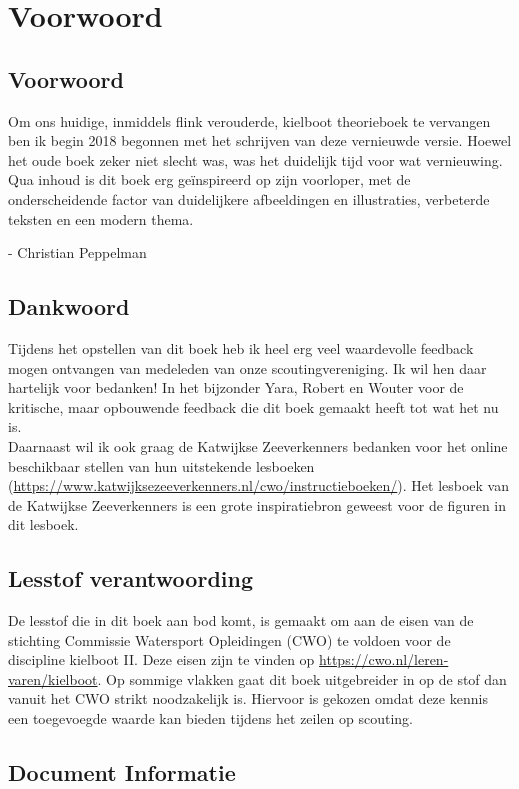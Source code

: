 \chapter*{Voorwoord}

\section{Voorwoord}
Om ons huidige, inmiddels flink verouderde, kielboot theorieboek te vervangen ben ik begin 2018 begonnen met het schrijven van deze vernieuwde versie. Hoewel het oude boek zeker niet slecht was, was het duidelijk tijd voor wat vernieuwing. Qua inhoud is dit boek erg geïnspireerd op zijn voorloper, met de onderscheidende factor van duidelijkere afbeeldingen en illustraties, verbeterde teksten en een modern thema.

- Christian Peppelman
\section{Dankwoord}
Tijdens het opstellen van dit boek heb ik heel erg veel waardevolle feedback mogen ontvangen van medeleden van onze scoutingvereniging. Ik wil hen daar hartelijk voor bedanken! In het bijzonder Yara, Robert en Wouter voor de kritische, maar opbouwende feedback die dit boek gemaakt heeft tot wat het nu is.\\
Daarnaast wil ik ook graag de Katwijkse Zeeverkenners bedanken voor het online beschikbaar stellen van hun uitstekende lesboeken (\url{https://www.katwijksezeeverkenners.nl/cwo/instructieboeken/}). Het lesboek van de Katwijkse Zeeverkenners is een grote inspiratiebron geweest voor de figuren in dit lesboek.

\newpage
\section{Lesstof verantwoording}
De lesstof die in dit boek aan bod komt, is gemaakt om aan de eisen van de stichting Commissie Watersport Opleidingen (CWO) te voldoen voor de discipline kielboot II. Deze eisen zijn te vinden op \url{https://cwo.nl/leren-varen/kielboot}. Op sommige vlakken gaat dit boek uitgebreider in op de stof dan vanuit het CWO strikt noodzakelijk is. Hiervoor is gekozen omdat deze kennis een toegevoegde waarde kan bieden tijdens het zeilen op scouting.


\section{Document Informatie}
